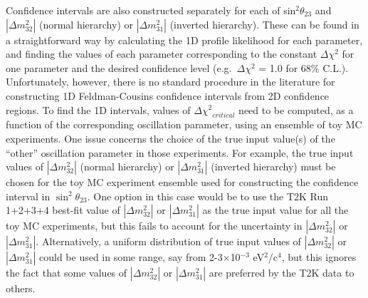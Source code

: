 Confidence intervals are also constructed separately for each of sin$^{2}\theta_{23}$ and $|\Delta m^{2}_{32}|$ (normal hierarchy) or 
$|\Delta m^{2}_{31}|$ (inverted hierarchy). 
These can be found in a straightforward way by calculating the 1D profile likelihood for each parameter, and finding the values of 
each parameter corresponding to the constant $\Delta\chi^{2}$ for one parameter and the desired confidence level (e.g.\ 
$\Delta\chi^{2}$ = 1.0 for 68\% C.L.). 
Unfortunately, however, there is no standard procedure in the literature for constructing 1D Feldman-Cousins confidence intervals from 
2D confidence regions. To find the 1D intervals, values of $\Delta{\chi^{2}}_{critical}$ need to be computed, as a function of the 
corresponding oscillation parameter, using an ensemble of toy MC experiments. One issue concerns the choice of the true input value(s) 
of the ``other'' oscillation parameter in those experiments. For example, the true input values of $|\Delta m_{32}^{2}|$ (normal hierarchy) 
or $|\Delta m_{31}^{2}|$ (inverted hierarchy) must be chosen for the toy MC experiment ensemble used for constructing the confidence interval 
in $\sin^2 \theta_{23}$. One option in this case would be to use the T2K Run 1+2+3+4 best-fit value of $|\Delta m_{32}^{2}|$ or $|\Delta m_{31}^{2}|$ 
as the true input value for all the toy MC experiments, but this fails to account for the uncertainty in $|\Delta m_{32}^{2}|$ or 
$|\Delta m_{31}^{2}|$. Alternatively, a uniform distribution of true input values of $|\Delta m_{32}^{2}|$ or $|\Delta m_{31}^{2}|$ could be used 
in some range, say from 2-3$\times$10$^{-3}$ eV$^{2}$/c$^{4}$, but this ignores the fact that some values of $|\Delta m_{32}^{2}|$ 
or $|\Delta m_{31}^{2}|$ are preferred by the T2K data to others.

